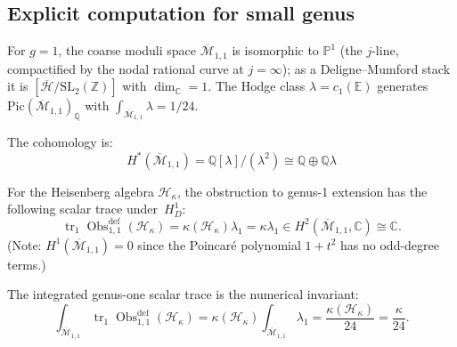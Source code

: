 \subsection{Explicit computation for small genus}

\begin{example}
\label{ex:genus-1-obstruction-complete}
For $g=1$, the coarse moduli space $\overline{\mathcal{M}}_{1,1}$ is isomorphic to $\mathbb{P}^1$ (the $j$-line, compactified by the nodal rational curve at $j = \infty$); as a Deligne--Mumford stack it is $[\overline{\mathcal{H}}/\mathrm{SL}_2(\mathbb{Z})]$ with $\dim_{\mathbb{C}} = 1$. The Hodge class $\lambda = c_1(\mathbb{E})$ generates $\mathrm{Pic}(\overline{\mathcal{M}}_{1,1})_{\mathbb{Q}}$ with $\int_{\overline{\mathcal{M}}_{1,1}} \lambda = 1/24$.

The cohomology is:
\begin{equation}
H^*(\overline{\mathcal{M}}_{1,1}) = \mathbb{Q}[\lambda] / (\lambda^2) \cong \mathbb{Q} \oplus \mathbb{Q}\lambda
\end{equation}

For the Heisenberg algebra $\mathcal{H}_\kappa$, the obstruction to
genus-1 extension has the following scalar trace under~$H_D^1$:
\begin{equation}
\operatorname{tr}_1\operatorname{Obs}^{\mathrm{def}}_{1,1}(\mathcal H_\kappa)
=\kappa(\mathcal H_\kappa)\lambda_1
=\kappa\lambda_1
\in H^2(\overline{\mathcal{M}}_{1,1}, \mathbb{C}) \cong \mathbb{C}.
\end{equation}
(Note: $H^1(\overline{\mathcal{M}}_{1,1}) = 0$ since the Poincar\'e polynomial $1 + t^2$ has no odd-degree terms.)

The integrated genus-one scalar trace is the numerical invariant:
\begin{equation}
\int_{\overline{\mathcal{M}}_{1,1}} \operatorname{tr}_1\operatorname{Obs}^{\mathrm{def}}_{1,1}(\mathcal H_\kappa)
=\kappa(\mathcal H_\kappa)
 \int_{\overline{\mathcal{M}}_{1,1}} \lambda_1
=\frac{\kappa(\mathcal H_\kappa)}{24}
=\frac{\kappa}{24}.
\end{equation}
\end{example}

